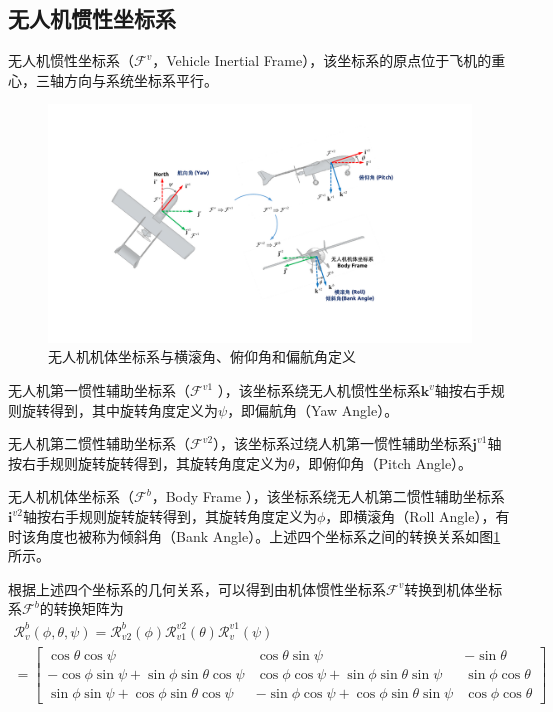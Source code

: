 \subsection{无人机惯性坐标系}
无人机惯性坐标系（$\mathcal{F}^v$，Vehicle Inertial Frame），该坐标系的原点位于飞机的重心，三轴方向与系统坐标系平行。

\begin{figure}[tb]   
	\centering
	\includegraphics[width=\textwidth]{figs/chp02/chp02_02_uav_rpy.pdf}
	\caption{无人机机体坐标系与横滚角、俯仰角和偏航角定义}
	\label{fig:chp02_02_uav_rpy}
\end{figure}

无人机第一惯性辅助坐标系（$\mathcal{F}^{v1}$ ），该坐标系绕无人机惯性坐标系$\mathbf{k}^v$轴按右手规则旋转得到，其中旋转角度定义为$\psi$，即偏航角（Yaw Angle）。

无人机第二惯性辅助坐标系（$\mathcal{F}^{v2}$），该坐标系过绕人机第一惯性辅助坐标系$\mathbf{j}^{v1}$轴按右手规则旋转旋转得到，其旋转角度定义为$\theta$，即俯仰角（Pitch Angle）。

无人机机体坐标系（$\mathcal{F}^b$，Body Frame ），该坐标系绕无人机第二惯性辅助坐标系$\mathbf{i}^{v2}$轴按右手规则旋转旋转得到，其旋转角度定义为$\phi$，即横滚角（Roll Angle），有时该角度也被称为倾斜角（Bank Angle）。上述四个坐标系之间的转换关系如图\ref{fig:chp02_02_uav_rpy}所示。

根据上述四个坐标系的几何关系，可以得到由机体惯性坐标系$\mathcal{F}^v$转换到机体坐标系$\mathcal{F}^b$的转换矩阵为
\begin{multline}
	\mathcal{R}_v^b(\phi, \theta, \psi) =\mathcal{R}_{v2}^b(\phi)\mathcal{R}_{v1}^{v2}(\theta)\mathcal{R}_v^{v1}(\psi) \\
	=\begin{bmatrix}
		\cos \theta \cos \psi                             & \cos\theta \sin\psi                               & -\sin\theta         \\
		-\cos\phi \sin\psi + \sin\phi \sin\theta \cos\psi & \cos\phi \cos\psi + \sin\phi \sin\theta\sin\psi   & \sin\phi \cos\theta \\
		\sin\phi \sin\psi + \cos\phi \sin\theta \cos\psi  & -\sin\phi \cos\psi + \cos\phi \sin\theta \sin\psi & \cos\phi \cos\theta
	\end{bmatrix}
\end{multline}





